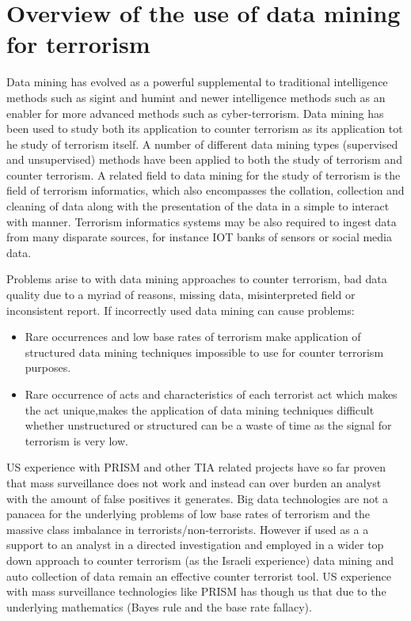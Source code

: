 \section{Overview of the use of data mining for terrorism}
Data mining has evolved as a powerful supplemental to traditional intelligence methods such as sigint and humint and newer intelligence methods such as an enabler for more advanced methods such as cyber-terrorism. Data mining has been used to study both its application to counter terrorism as its application tot he study of terrorism itself. A number of different data mining  types (supervised and unsupervised) methods  have been applied to both the study of terrorism and counter terrorism. A related field to data mining for the study of terrorism is the field of terrorism informatics, which also encompasses the collation, collection and cleaning of data along with the presentation of the data in a simple to interact with manner. Terrorism informatics systems may be also required to ingest data from many disparate sources, for instance IOT banks of sensors or social media data.

Problems arise to with data mining approaches to counter terrorism, bad data quality due to a myriad of reasons, missing data, misinterpreted field or inconsistent report.
If incorrectly used data mining can cause problems:
\begin{itemize}
\item Rare occurrences and low base rates of terrorism make application of structured data mining techniques impossible to use for counter terrorism purposes.
\item Rare occurrence of acts and characteristics of each terrorist act which  makes the act unique,makes the application of  data mining techniques difficult whether unstructured or structured can be a waste of time as the signal for terrorism is very low.
\end{itemize}

US experience with PRISM and other TIA related projects have so far proven that mass
surveillance does not work and instead can over burden an analyst with the amount of false positives it generates. Big data technologies are not a panacea for the underlying problems  of low base rates of terrorism and the massive class imbalance in terrorists/non-terrorists. However if used as a a support to an analyst in a directed investigation and employed in a wider top down approach to counter terrorism (as the Israeli experience) data mining and auto collection of data remain an effective counter terrorist tool. US experience with mass surveillance technologies like
PRISM has though us that  due to the underlying mathematics (Bayes rule and the base rate fallacy). 

